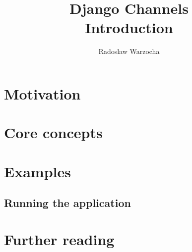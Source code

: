 \documentclass{beamer}
\title{Django Channels\\Introduction}
\author[rwar]{Radoslaw Warzocha}
\begin{document}
\begin{frame}
	\titlepage
\end{frame}

\section{Motivation}

\section{Core concepts}

\section{Examples}

\subsection{Running the application}

\section{Further reading}
\end{document}
